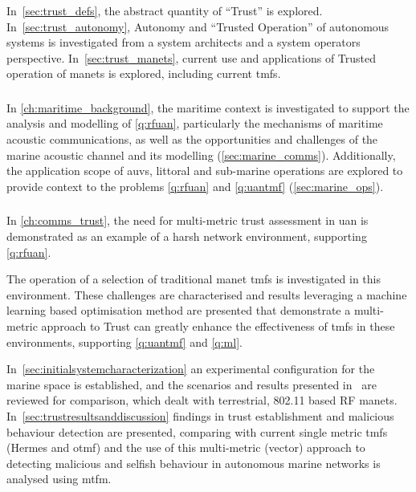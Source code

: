 In~\autoref{sec:trust_defs}, the abstract quantity of ``Trust'' is explored.
In~\autoref{sec:trust_autonomy}, Autonomy and ``Trusted Operation'' of autonomous systems is investigated from a system architects and a system operators perspective.
In~\autoref{sec:trust_manets}, current use and applications of Trusted operation of \glspl{manet} is explored, including current \glspl{tmf}.

\subsubsection{}
In \autoref{ch:maritime_background}, the maritime context is investigated to support the analysis and modelling of \ref{q:rfuan}, particularly the mechanisms of maritime acoustic communications, as well as the opportunities and challenges of the marine acoustic channel and its modelling (\autoref{sec:marine_comms}).
Additionally, the application scope of \glspl{auv}, littoral and sub-marine operations are explored to provide context to the problems \ref{q:rfuan} and \ref{q:uantmf} (\autoref{sec:marine_ops}).

\subsubsection{}
In \autoref{ch:comms_trust}, the need for multi-metric trust assessment in \gls{uan} is demonstrated as an example of a harsh network environment, supporting \ref{q:rfuan}.

The operation of a selection of traditional \gls{manet} \glspl{tmf} is investigated in this environment.
These challenges are characterised and results leveraging a machine learning based optimisation method are presented that demonstrate a multi-metric approach to Trust can greatly enhance the effectiveness of \glspl{tmf} in these environments, supporting \ref{q:uantmf} and \ref{q:ml}.

In~\autoref{sec:initialsystemcharacterization} an experimental configuration for the marine space is established, and the scenarios and results presented in~\citet{Guo11} are reviewed for comparison, which dealt with terrestrial, 802.11 based RF \glspl{manet}.
In~\autoref{sec:trustresultsanddiscussion} findings in trust establishment and malicious behaviour detection are presented, comparing with current single metric \glspl{tmf} (Hermes and \gls{otmf}) and the use of this multi-metric (vector) approach to detecting malicious and selfish behaviour in autonomous marine networks is analysed using \gls{mtfm}.

